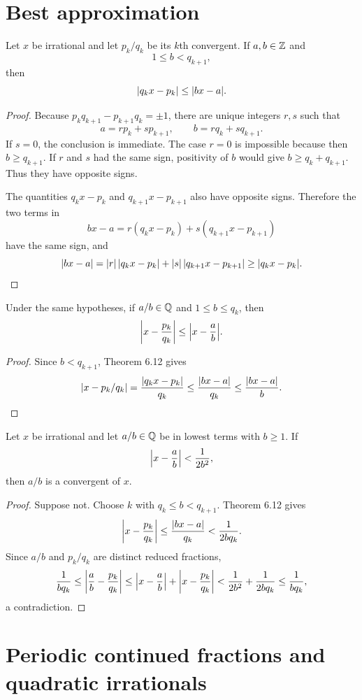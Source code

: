\section{Best approximation}

\begin{thm}
Let $x$ be irrational and let $p_k/q_k$ be its $k$th convergent.  If $a,b\in\Z$ and
\[
 1\le b<q_{k+1},
\]
then
\[
 \abs*{q_kx-p_k}\le\abs*{bx-a}.
\]
\end{thm}
\begin{proof}
Because
$p_kq_{k+1}-p_{k+1}q_k=\pm1$, there are unique integers $r,s$ such that
\[
 a=rp_k+sp_{k+1},
 \qquad
 b=rq_k+sq_{k+1}.
\]
If $s=0$, the conclusion is immediate.  The case $r=0$ is impossible because then $b\ge q_{k+1}$.  If $r$ and $s$ had the same sign, positivity of $b$ would give $b\ge q_k+q_{k+1}$.  Thus they have opposite signs.

The quantities $q_kx-p_k$ and $q_{k+1}x-p_{k+1}$ also have opposite signs.  Therefore the two terms in
\[
 bx-a=r(q_kx-p_k)+s(q_{k+1}x-p_{k+1})
\]
have the same sign, and
\[
 \abs*{bx-a}
 =\abs r\,\abs*{q_kx-p_k}+\abs s\,\abs*{q_{k+1}x-p_{k+1}}
 \ge\abs*{q_kx-p_k}.
\]
\end{proof}

\begin{thm}
Under the same hypotheses, if $a/b\in\Q$ and $1\le b\le q_k$, then
\[
 \abs*{x-\frac{p_k}{q_k}}
 \le\abs*{x-\frac ab}.
\]
\end{thm}
\begin{proof}
Since $b<q_{k+1}$, Theorem 6.12 gives
\[
 \abs*{x-p_k/q_k}
 =\frac{\abs*{q_kx-p_k}}{q_k}
 \le\frac{\abs*{bx-a}}{q_k}
 \le\frac{\abs*{bx-a}}b.
\]
\end{proof}

\begin{thm}
Let $x$ be irrational and let $a/b\in\Q$ be in lowest terms with $b\ge1$.  If
\[
 \abs*{x-\frac ab}<\frac1{2b^2},
\]
then $a/b$ is a convergent of $x$.
\end{thm}
\begin{proof}
Suppose not.  Choose $k$ with $q_k\le b<q_{k+1}$.  Theorem 6.12 gives
\[
 \abs*{x-\frac{p_k}{q_k}}
 \le\frac{\abs*{bx-a}}{q_k}
 <\frac1{2bq_k}.
\]
Since $a/b$ and $p_k/q_k$ are distinct reduced fractions,
\[
 \frac1{bq_k}
 \le\abs*{\frac ab-\frac{p_k}{q_k}}
 \le\abs*{x-\frac ab}+\abs*{x-\frac{p_k}{q_k}}
 <\frac1{2b^2}+\frac1{2bq_k}
 \le\frac1{bq_k},
\]
a contradiction.
\end{proof}

\section{Periodic continued fractions and quadratic irrationals}

